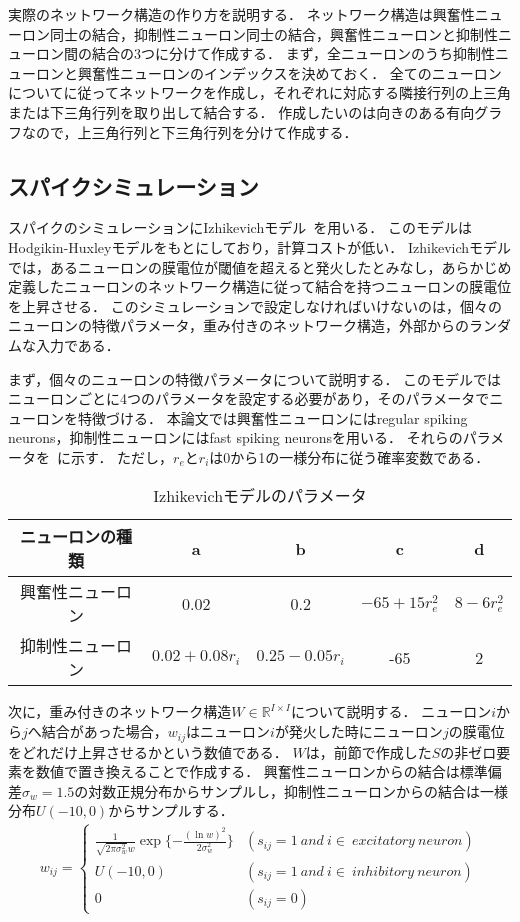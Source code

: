 実際のネットワーク構造の作り方を説明する．
ネットワーク構造は興奮性ニューロン同士の結合，抑制性ニューロン同士の結合，興奮性ニューロンと抑制性ニューロン間の結合の3つに分けて作成する．
まず，全ニューロンのうち抑制性ニューロンと興奮性ニューロンのインデックスを決めておく．
全てのニューロンについてに従ってネットワークを作成し，それぞれに対応する隣接行列の上三角または下三角行列を取り出して結合する．
作成したいのは向きのある有向グラフなので，上三角行列と下三角行列を分けて作成する．

\subsection{スパイクシミュレーション}
スパイクのシミュレーションにIzhikevichモデル~\cite{Izhikevich2003}を用いる．
このモデルはHodgikin-Huxleyモデルをもとにしており，計算コストが低い．
Izhikevichモデルでは，あるニューロンの膜電位が閾値を超えると発火したとみなし，あらかじめ定義したニューロンのネットワーク構造に従って結合を持つニューロンの膜電位を上昇させる．
このシミュレーションで設定しなければいけないのは，個々のニューロンの特徴パラメータ，重み付きのネットワーク構造，外部からのランダムな入力である．

まず，個々のニューロンの特徴パラメータについて説明する．
このモデルではニューロンごとに4つのパラメータを設定する必要があり，そのパラメータでニューロンを特徴づける．
本論文では興奮性ニューロンにはregular spiking neurons，抑制性ニューロンにはfast spiking neuronsを用いる．
それらのパラメータを~に示す．
ただし，$r_e$と$r_i$は0から1の一様分布に従う確率変数である．

\begin{table}[htb]
  \center
  \begin{tabular}{|c|cccc|} \hline
    ニューロンの種類 & a & b & c & d \\ \hline
    興奮性ニューロン & 0.02 & 0.2 & $-65 + 15 r_e^2$ & $8 - 6r_e^2$ \\
    抑制性ニューロン & $0.02 + 0.08r_i$ & $0.25 - 0.05 r_i$ & -65 & 2 \\ \hline
  \end{tabular}
  \caption{Izhikevichモデルのパラメータ}
  \label{tab:parameter2}
\end{table}

次に，重み付きのネットワーク構造$W \in \mathbb{R}^{I \times I}$について説明する．
ニューロン$i$から$j$へ結合があった場合，$w_{ij}$はニューロン$i$が発火した時にニューロン$j$の膜電位をどれだけ上昇させるかという数値である．
$W$は，前節で作成した$S$の非ゼロ要素を数値で置き換えることで作成する．
興奮性ニューロンからの結合は標準偏差$\sigma_w = 1.5$の対数正規分布からサンプルし，抑制性ニューロンからの結合は一様分布$U(-10,0)$からサンプルする．
\begin{align}
	w_{ij} = \begin{cases}
		\frac{1}{\sqrt{2 \pi \sigma_w^2}w} \exp \{ - \frac{(\ln w)^2}{2 \sigma_w^2}\} & (s_{ij} = 1 \ and \ i \in \ excitatory \ neuron) \\
		U(-10,0) & (s_{ij} = 1 \ and \ i \in \ inhibitory\  neuron) \\
		0 & (s_{ij} = 0)
  \end{cases}
	\label{eq:W}
\end{align}

